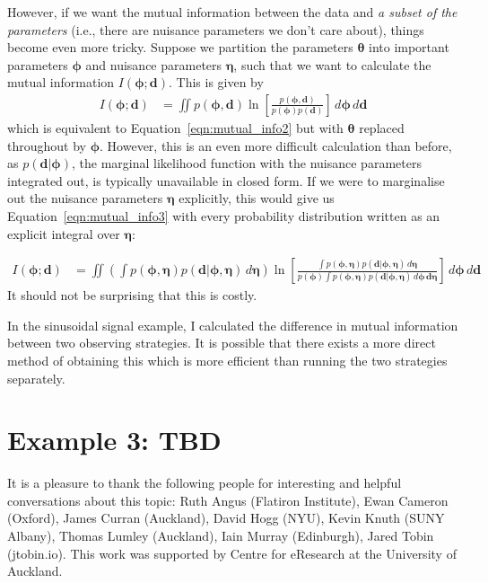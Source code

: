 \documentclass[entropy,article,accept,oneauthor,pdftex,10pt,a4paper]{mdpi}
\renewcommand{\d}{\boldsymbol{d}}
\newcommand{\x}{\boldsymbol{\theta}}
\newcommand{\bphi}{\boldsymbol{\phi}}
\newcommand{\boldeta}{\boldsymbol{\eta}}
\begin{document}
However, if we want the mutual information between the data and
{\em a subset of the parameters} (i.e., there are nuisance parameters
we don't care about), things become even more tricky. Suppose we
partition the parameters $\x$ into important parameters
$\bphi$ and nuisance parameters $\boldeta$, such that we want to calculate
the mutual information $I(\bphi; \d)$. This is given by
\begin{align}
I(\bphi; \d) &= \iint p(\bphi, \d)
                        \ln \left[\frac{p(\bphi, \d)}{p(\bphi)p(\d)}\right]
                        \, d\bphi \, d\d \label{eqn:mutual_info3}
\end{align}
which is equivalent to Equation~\ref{eqn:mutual_info2} but with
$\x$ replaced throughout by $\bphi$. However, this is an even more
difficult calculation than before, as $p(\d | \bphi)$, the marginal likelihood
function with the nuisance parameters integrated out, is typically
unavailable in closed form. If we were to marginalise out the nuisance
parameters $\boldeta$ explicitly, this would give us
Equation~\ref{eqn:mutual_info3} with every probability distribution
written as an explicit integral over $\boldeta$:

\begin{align}
I(\bphi; \d) &= \iint
  \left(\int p(\bphi, \boldeta)p(\d | \bphi, \boldeta) \, d\boldeta\right)
                        \ln \left[
  \frac{\int p(\bphi, \boldeta)p(\d | \bphi, \boldeta) \, d\boldeta}
{p(\bphi)\int p(\bphi, \boldeta)p(\d | \bphi, \boldeta) \, d\bphi \, \d\boldeta}\right]
                        \, d\bphi \, d\d
\end{align}
It should not be surprising that this is costly.

In the sinusoidal signal example, I calculated the difference in
mutual information between two observing strategies. It is possible
that there exists a more direct method of obtaining this which
is more efficient than running the two strategies separately.

\section{Example 3: TBD}

It is a pleasure to thank the following people for interesting and helpful
conversations about this topic: Ruth Angus (Flatiron Institute),
Ewan Cameron (Oxford), James Curran (Auckland),
David Hogg (NYU), Kevin Knuth (SUNY Albany),
Thomas Lumley (Auckland),
Iain Murray (Edinburgh), Jared Tobin (jtobin.io).
This work was supported by Centre for eResearch
at the University of Auckland.
\end{document}
